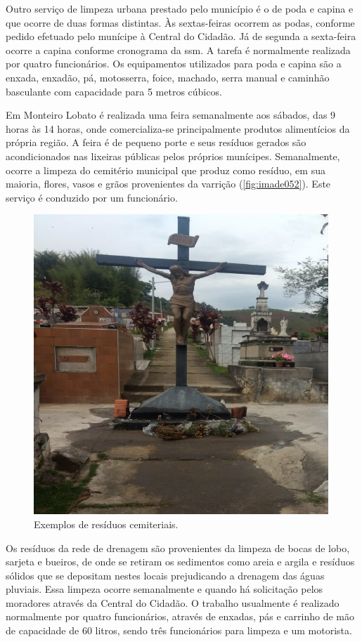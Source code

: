 Outro serviço de limpeza urbana prestado pelo município é o de poda e capina e que ocorre de duas formas distintas. Às sextas-feiras ocorrem as podas, conforme pedido efetuado pelo munícipe à Central do Cidadão. Já de segunda a sexta-feira ocorre a capina conforme cronograma da \gls{ssm}. A tarefa é normalmente realizada por quatro funcionários. Os equipamentos utilizados para poda e capina são a enxada, enxadão, pá, motosserra, foice, machado, serra manual e caminhão basculante com capacidade para 5 metros cúbicos.

Em Monteiro Lobato é realizada uma feira semanalmente aos sábados, das 9 horas às 14 horas, onde comercializa-se principalmente produtos alimentícios da própria região. A feira é de pequeno porte e seus resíduos gerados são acondicionados nas lixeiras públicas pelos próprios munícipes. Semanalmente, ocorre a limpeza do cemitério municipal que produz como resíduo, em sua maioria, flores, vasos e grãos provenientes da varrição (\autoref{fig:imade052}). Este serviço é conduzido por um funcionário.

\begin{figure}
	\centering
	\includegraphics[width=0.5\linewidth]{produtos/prodtres/image052}
	\caption{Exemplos de resíduos cemiteriais.}
	\label{fig:image052}
\end{figure}


Os resíduos da rede de drenagem são provenientes da limpeza de bocas de lobo, sarjeta e bueiros, de onde se retiram os sedimentos como areia e argila e resíduos sólidos que se depositam nestes locais prejudicando a drenagem das águas pluviais. Essa limpeza ocorre semanalmente e quando há solicitação pelos moradores através da Central do Cidadão. O trabalho usualmente é realizado normalmente por quatro funcionários, através de enxadas, pás e carrinho de mão de capacidade de 60 litros, sendo três funcionários para limpeza e um motorista.

